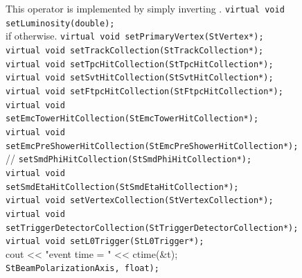     This operator is implemented by simply inverting .
    \verb+virtual void setLuminosity(double);+\\
    if otherwise. 
    \verb+virtual void setPrimaryVertex(StVertex*);+\\
    
    \verb+virtual void setTrackCollection(StTrackCollection*);+\\
    \verb+virtual void setTpcHitCollection(StTpcHitCollection*);+\\
    \verb+virtual void setSvtHitCollection(StSvtHitCollection*);+\\
    \verb+virtual void setFtpcHitCollection(StFtpcHitCollection*);+\\
    \verb+virtual void+\\
    \verb+setEmcTowerHitCollection(StEmcTowerHitCollection*);+\\
    \verb+virtual void+\\
    \verb+setEmcPreShowerHitCollection(StEmcPreShowerHitCollection*);+\\
//   
    \verb+setSmdPhiHitCollection(StSmdPhiHitCollection*);+\\
    \verb+virtual void+\\
    \verb+setSmdEtaHitCollection(StSmdEtaHitCollection*);+\\
    \verb+virtual void setVertexCollection(StVertexCollection*);+\\
    \verb+virtual void+\\
    \verb+setTriggerDetectorCollection(StTriggerDetectorCollection*);+\\
    \verb+virtual void setL0Trigger(StL0Trigger*);+\\
     cout << "event time = " << ctime(&t);     
    \verb+                         StBeamPolarizationAxis, float);+\\

